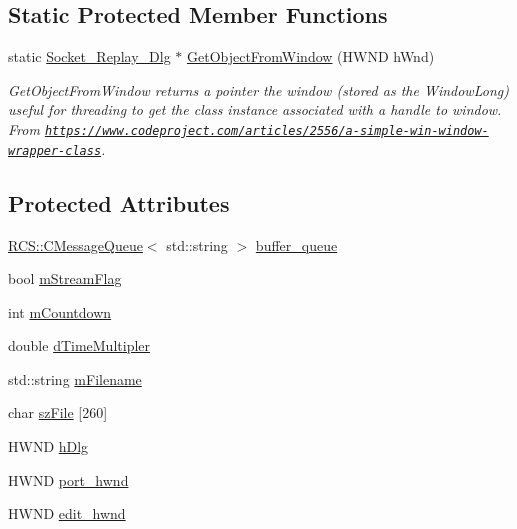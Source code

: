 \subsection*{Static Protected Member Functions}
\begin{DoxyCompactItemize}
\item 
static \hyperlink{class_socket___replay___dlg}{Socket\+\_\+\+Replay\+\_\+\+Dlg} $\ast$ \hyperlink{class_socket___replay___dlg_af6e2f42dcc3163aa721a51e2e7dcdfeb}{Get\+Object\+From\+Window} (H\+W\+N\+D h\+Wnd)
\begin{DoxyCompactList}\small\item\em Get\+Object\+From\+Window returns a pointer the window (stored as the Window\+Long) useful for threading to get the class instance associated with a handle to window. From \href{https://www.codeproject.com/articles/2556/a-simple-win-window-wrapper-class}{\tt https\+://www.\+codeproject.\+com/articles/2556/a-\/simple-\/win-\/window-\/wrapper-\/class}. \end{DoxyCompactList}\end{DoxyCompactItemize}
\subsection*{Protected Attributes}
\begin{DoxyCompactItemize}
\item 
\hyperlink{class_r_c_s_1_1_c_message_queue}{R\+C\+S\+::\+C\+Message\+Queue}$<$ std\+::string $>$ \hyperlink{class_socket___replay___dlg_abd2145fb90191384c2c5928d72e9d379}{buffer\+\_\+queue}
\item 
bool \hyperlink{class_socket___replay___dlg_a8cd78cb4dff6ecf4e8dd28f594a576d5}{m\+Stream\+Flag}
\item 
int \hyperlink{class_socket___replay___dlg_a14e128197a6d5df0e693de4d6bac4861}{m\+Countdown}
\item 
double \hyperlink{class_socket___replay___dlg_a8e885816d205a4d5546284fb776fb6a9}{d\+Time\+Multipler}
\item 
std\+::string \hyperlink{class_socket___replay___dlg_ab9d98b70c4ae758d9c9e22c707873188}{m\+Filename}
\item 
char \hyperlink{class_socket___replay___dlg_abe629565b9f82aff477a8e1b9c605073}{sz\+File} \mbox{[}260\mbox{]}
\item 
H\+W\+N\+D \hyperlink{class_socket___replay___dlg_a00afcf609f06368bbe64cf31546736d0}{h\+Dlg}
\item 
H\+W\+N\+D \hyperlink{class_socket___replay___dlg_ad75481e9b07fe142613fa5a03939498e}{port\+\_\+hwnd}
\item 
H\+W\+N\+D \hyperlink{class_socket___replay___dlg_a6f6192476df2dab219666f4bf716631e}{edit\+\_\+hwnd}
\end{DoxyCompactItemize}


